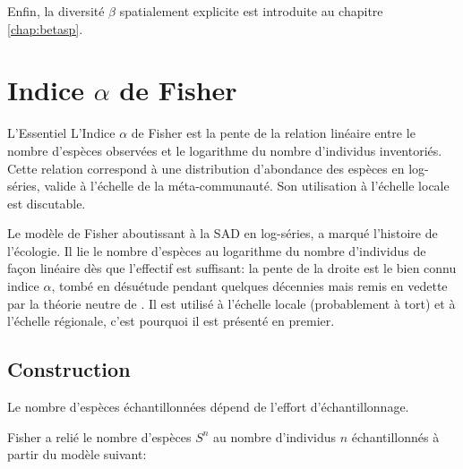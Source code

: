 \documentclass[
  11pt,
  french,
  a4paper,
  extrafontsizes,onecolumn,openright
  ]{memoir}
\newenvironment{Summary}
  {\begin{bclogo}[logo=\bctrombone, noborder=true, couleur=lightgray!50]{L'Essentiel}\parindent0pt}
  {\end{bclogo}}
\begin{document}
Enfin, la diversité \(\beta\) spatialement explicite est introduite au chapitre \ref{chap:betasp}.

\hypertarget{chap:Fisher}{%
\chapter{\texorpdfstring{Indice \(\alpha\) de Fisher}{Indice \textbackslash alpha de Fisher}}\label{chap:Fisher}}

\scriptsize

\begin{Summary}
L'Indice \(\alpha\) de Fisher est la pente de la relation linéaire entre
le nombre d'espèces observées et le logarithme du nombre d'individus
inventoriés. Cette relation correspond à une distribution d'abondance
des espèces en log-séries, valide à l'échelle de la méta-communauté. Son
utilisation à l'échelle locale est discutable.
\end{Summary}

\normalsize

Le modèle de Fisher \autocite{Fisher1943} aboutissant à la SAD en log-séries, a marqué l'histoire de l'écologie.
Il lie le nombre d'espèces au logarithme du nombre d'individus de façon linéaire dès que l'effectif est suffisant: la pente de la droite est le bien connu indice \(\alpha\), tombé en désuétude pendant quelques décennies mais remis en vedette par la théorie neutre de \textcite{Hubbell2001}.
Il est utilisé à l'échelle locale (probablement à tort) et à l'échelle régionale, c'est pourquoi il est présenté en premier.

\hypertarget{construction}{%
\section{Construction}\label{construction}}

Le nombre d'espèces échantillonnées dépend de l'effort d'échantillonnage.

Fisher a relié le nombre d'espèces \(S^{n}\) au nombre d'individus \(n\) échantillonnés à partir du modèle suivant:
\end{document}
